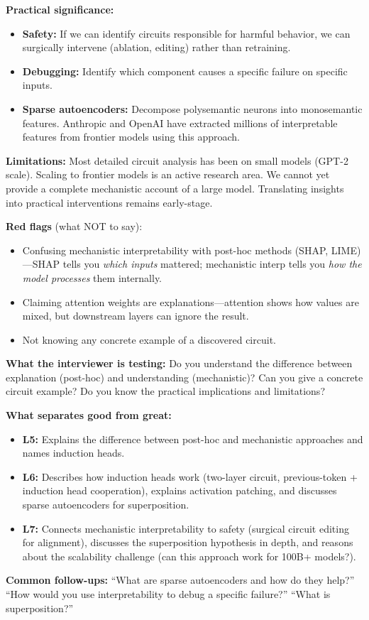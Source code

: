 \begin{interviewq}
\textbf{Practical significance:}
\begin{itemize}
    \item \textbf{Safety:} If we can identify circuits responsible for harmful behavior, we can surgically intervene (ablation, editing) rather than retraining.
    \item \textbf{Debugging:} Identify which component causes a specific failure on specific inputs.
    \item \textbf{Sparse autoencoders:} Decompose polysemantic neurons into monosemantic features. Anthropic and OpenAI have extracted millions of interpretable features from frontier models using this approach.
\end{itemize}

\textbf{Limitations:} Most detailed circuit analysis has been on small models (GPT-2 scale). Scaling to frontier models is an active research area. We cannot yet provide a complete mechanistic account of a large model. Translating insights into practical interventions remains early-stage.

\textbf{Red flags} (what NOT to say):
\begin{itemize}
    \item Confusing mechanistic interpretability with post-hoc methods (SHAP, LIME)---SHAP tells you \textit{which inputs} mattered; mechanistic interp tells you \textit{how the model processes} them internally.
    \item Claiming attention weights are explanations---attention shows how values are mixed, but downstream layers can ignore the result.
    \item Not knowing any concrete example of a discovered circuit.
\end{itemize}

\textbf{What the interviewer is testing:} Do you understand the difference between explanation (post-hoc) and understanding (mechanistic)? Can you give a concrete circuit example? Do you know the practical implications and limitations?

\textbf{What separates good from great:}
\begin{itemize}
    \item \textbf{L5:} Explains the difference between post-hoc and mechanistic approaches and names induction heads.
    \item \textbf{L6:} Describes how induction heads work (two-layer circuit, previous-token + induction head cooperation), explains activation patching, and discusses sparse autoencoders for superposition.
    \item \textbf{L7:} Connects mechanistic interpretability to safety (surgical circuit editing for alignment), discusses the superposition hypothesis in depth, and reasons about the scalability challenge (can this approach work for 100B+ models?).
\end{itemize}

\textbf{Common follow-ups:} ``What are sparse autoencoders and how do they help?'' ``How would you use interpretability to debug a specific failure?'' ``What is superposition?''
\end{interviewq}

